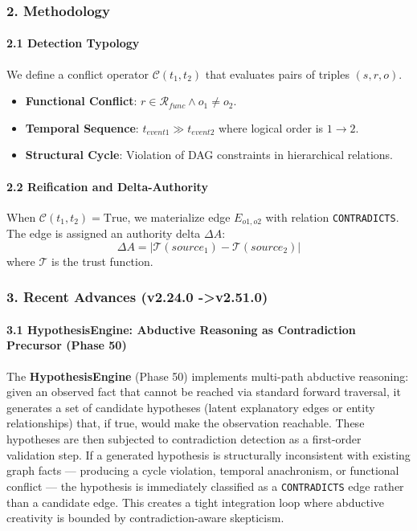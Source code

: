 \subsubsection{2. Methodology}

\paragraph{2.1 Detection Typology}
We define a conflict operator $\mathcal{C}(t_1, t_2)$ that evaluates pairs of triples $(s, r, o)$.
\begin{itemize}
\item \textbf{Functional Conflict}: $r \in \mathcal{R}_{func} \land o_1 \neq o_2$.
\item \textbf{Temporal Sequence}: $t_{event1} \gg t_{event2}$ where logical order is $1 \to 2$.
\item \textbf{Structural Cycle}: Violation of DAG constraints in hiera\-rchical relations.

\end{itemize}
\paragraph{2.2 Reification and Delta-Authority}
When $\mathcal{C}(t_1, t_2) = \text{True}$, we materialize edge $E_{o1,o2}$ with relation \texttt{CONTRADICTS}. The edge is assigned an authority delta $\Delta A$:
\begin{equation}
\Delta A = | \mathcal{T}(source_1) - \mathcal{T}(source_2) |
\end{equation}
where $\mathcal{T}$ is the trust function.

\subsubsection{3. Recent Advances (v2.24.0 -\textgreater  v2.51.0)}

\paragraph{3.1 HypothesisEngine: Abductive Reasoning as Contra\-diction Precursor (Phase 50)}
The \textbf{HypothesisEngine} (Phase 50) implements multi-path abductive reasoning: given an observed fact that cannot be reached via standard forward traversal, it generates a set of candidate hypotheses (latent explanatory edges or entity relat\-ionships) that, if true, would make the observation reachable. These hypotheses are then subjected to contr\-adiction detection as a first-order validation step. If a generated hypothesis is struc\-turally incon\-sistent with existing graph facts — producing a cycle violation, temporal anachronism, or functional conflict — the hypothesis is immediately classified as a \texttt{CONTRADICTS} edge rather than a candidate edge. This creates a tight integration loop where abductive creativity is bounded by contr\-adiction-aware skepticism.

